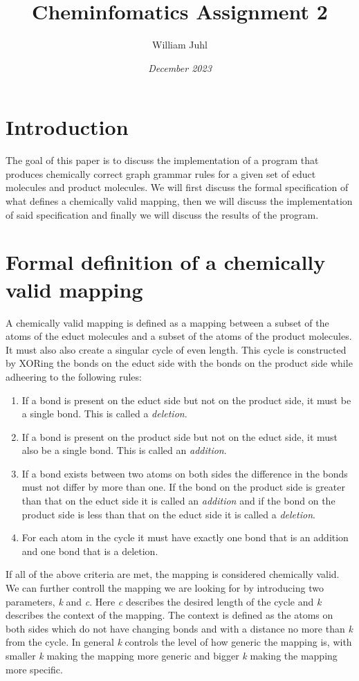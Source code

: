 \documentclass{article}
\title{\textbf{Cheminfomatics Assignment 2}}
\author{William Juhl}
\date{\textit{December 2023}}
\begin{document}
\thispagestyle{empty}

\maketitle
\newpage
\thispagestyle{empty}

\tableofcontents

\newpage
\section{Introduction}

The goal of this paper is to discuss the implementation of a program that produces chemically correct graph grammar rules for a given set of educt molecules and product molecules. We will first discuss the formal specification of what defines a chemically valid mapping, then we will discuss the implementation of said specification and finally we will discuss the results of the program.

\newpage
\section{Formal definition of a chemically valid mapping}

A chemically valid mapping is defined as a mapping between a subset of the atoms of the educt molecules and a subset of the atoms of the product molecules. It must also also create a singular cycle of even length. This cycle is constructed by XORing the bonds on the educt side with the bonds on the product side while adheering to the following rules: 
\begin{enumerate}
    \item If a bond is present on the educt side but not on the product side, it must be a single bond. This is called a \textit{deletion}.
    \item If a bond is present on the product side but not on the educt side, it must also be a single bond. This is called an \textit{addition}.
    \item If a bond exists between two atoms on both sides the difference in the bonds must not differ by more than one. If the bond on the product side is greater than that on the educt side it is called an \textit{addition} and if the bond on the product side is less than that on the educt side it is called a \textit{deletion}.
    \item For each atom in the cycle it must have exactly one bond that is an addition and one bond that is a deletion.
\end{enumerate}
If all of the above criteria are met, the mapping is considered chemically valid. We can further controll the mapping we are looking for by introducing two parameters, \textit{k} and \textit{c}. Here \textit{c} describes the desired length of the cycle and \textit{k} describes the context of the mapping. The context is defined as the atoms on both sides which do not have changing bonds and with a distance no more than \textit{k} from the cycle. In general \textit{k} controls the level of how generic the mapping is, with smaller \textit{k} making the mapping more generic and bigger \textit{k} making the mapping more specific.
\end{document}
